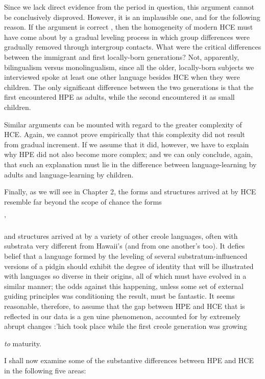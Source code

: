 Since we lack direct evidence from the period in question, this argument cannot be conclusively disproved. However, it is an im\-plausible one, and for the following reason. If the argument is correct , then the homogeneity of modern HCE must have come about by a gradual leveling process in which group differences were gradually removed through intergroup contacts. What were the critical differ\-ences between the immigrant and first locally-born generations? Not, apparently, bilingualism versus monolingualism, since all the older, locally-born subjects we interviewed spoke at least one other language besides HCE when they were children. The only significant difference between the two generations is that the first encountered HPE as adults, while the second encountered it as small children.

Similar arguments can be mounted with regard to the greater complexity of HCE. Again, we cannot prove empirically that this complexity did not result from gradual increment. If we assume that it did, however, we have to explain why HPE did not also become more complex; and we can only conclude, again, that such an explanation must lie in the difference between language-learning by adults and language-learning by children.

Finally, as we will see in Chapter 2, the forms and structures arrived at by HCE resemble far beyond the scope of chance the forms

'


and structures arrived at by a variety of other creole languages, often with substrata very different from Hawaii's (and from one another's too). It defies belief that a language formed by the leveling of several substratum-influenced versions of a pidgin should exhibit the degree of identity that will be illustrated with languages so diverse in their origins, all of which must have evolved in a similar manner; the odds against this happening, unless some set of external guiding principles was condi\-tioning the result, must be fantastic. It seems reasonable, therefore, to assume that the gap between HPE and HCE that is reflected in our data is a gen uine phenomenon, accounted for by extremely abrupt changes :'hich took place while the first creole generation was growing

\textit{to} maturity.

I shall now examine some of the substantive differences between HPE and HCE in the following five areas:

